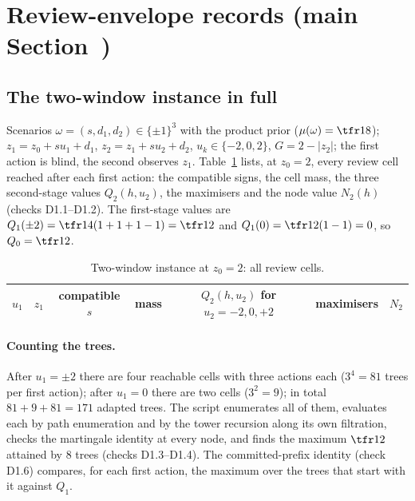 \section{Review-envelope records (main Section~)}\label{si:review}

\subsection{The two-window instance in full}
Scenarios $\omega=(s,d_1,d_2)\in\{\pm1\}^3$ with the product prior ($\mu(\omega)=\tfr18$); $z_1=z_0+su_1+d_1$, $z_2=z_1+su_2+d_2$, $u_k\in\{-2,0,2\}$, $G=2-|z_2|$; the first action is blind, the second observes $z_1$. Table~\ref{tab:tree} lists, at $z_0=2$, every review cell reached after each first action: the compatible signs, the cell mass, the three second-stage values $Q_2(h,u_2)$, the maximisers and the node value $N_2(h)$ (checks D1.1--D1.2). The first-stage values are $Q_1(\pm2)=\tfr14(1+1+1-1)=\tfr12$ and $Q_1(0)=\tfr12(1-1)=0$, so $Q_0=\tfr12$.

\begin{table}[H]
\centering\small
\caption{Two-window instance at $z_0=2$: all review cells.}
\label{tab:tree}
\begin{tabular}{ccccccc}
\toprule
$u_1$ & $z_1$ & compatible $s$ & mass & $Q_2(h,u_2)$ for $u_2=-2,0,+2$ & maximisers & $N_2$\\
\midrule

\bottomrule
\end{tabular}
\end{table}

\paragraph{Counting the trees.} After $u_1=\pm2$ there are four reachable cells with three actions each ($3^4=81$ trees per first action); after $u_1=0$ there are two cells ($3^2=9$); in total $81+9+81=171$ adapted trees. The script enumerates all of them, evaluates each by path enumeration and by the tower recursion along its own filtration, checks the martingale identity at every node, and finds the maximum $\tfr12$ attained by $8$ trees (checks D1.3--D1.4). The committed-prefix identity (check D1.6) compares, for each first action, the maximum over the trees that start with it against $Q_1$.

